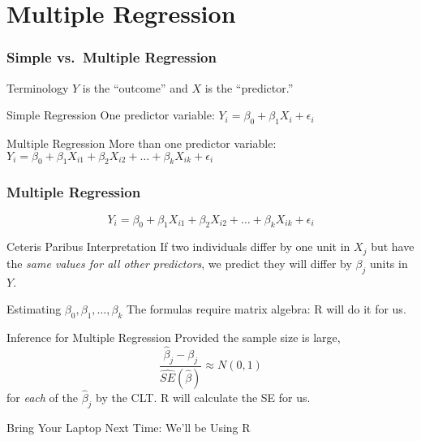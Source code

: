 \section{Multiple Regression}
\begin{frame}
\frametitle{Simple vs.\ Multiple Regression}
\begin{block}{Terminology}
$Y$ is the ``outcome'' and $X$ is the ``predictor.''
\end{block}

\begin{block}{Simple Regression}
One predictor variable: $Y_i = \beta_0 + \beta_1 X_i + \epsilon_i$
\end{block}
\begin{block}{Multiple Regression}
More than one predictor variable: $Y_i = \beta_0 + \beta_1 X_{i1} + \beta_2 X_{i2} +  \hdots + \beta_k X_{ik} + \epsilon_i$
\end{block}



\end{frame}


\begin{frame}
\frametitle{Multiple Regression}
$$Y_i = \beta_0 + \beta_1 X_{i1} + \beta_2 X_{i2} +  \hdots + \beta_k X_{ik} + \epsilon_i$$

\begin{block}{Ceteris Paribus Interpretation}
  If two individuals differ by one unit in $X_j$ but have the \emph{same values for all other predictors}, we predict they will differ by $\beta_j$ units in $Y$.
\end{block}

\begin{block}{Estimating $\beta_0, \beta_1, \dots, \beta_k$}
  The formulas require matrix algebra: R will do it for us.
\end{block}

\begin{block}{Inference for Multiple Regression}
Provided the sample size is large, 
	$$\frac{\widehat{\beta}_j - \beta_j}{\widehat{SE}(\widehat{\beta})} \approx N(0,1)$$
for \emph{each} of the $\widehat{\beta}_j$ by the CLT. 
R will calculate the SE for us.
\end{block}

\end{frame}

\begin{frame}
\begin{center}
\Huge Bring Your Laptop Next Time: We'll be Using R
\end{center}

\end{frame}

